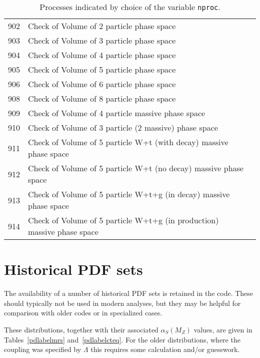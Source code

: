 \documentclass[12pt]{article}
\begin{document}
\begin{table}
\begin{center}
\begin{tabular}{|l|l|l|}
\hline
902 & Check of Volume of 2 particle phase space & \\  
903 & Check of Volume of 3 particle phase space & \\  
904 & Check of Volume of 4 particle phase space & \\  
905 & Check of Volume of 5 particle phase space & \\  
906 & Check of Volume of 6 particle phase space & \\  
908 & Check of Volume of 8 particle phase space & \\  
909 & Check of Volume of 4 particle massive phase space & \\  
910 & Check of Volume of 3 particle (2 massive) phase space & \\  
911 & Check of Volume of 5 particle W+t (with decay) massive phase space & \\  
912 & Check of Volume of 5 particle W+t (no decay) massive phase space & \\  
913 & Check of Volume of 5 particle W+t+g (in decay) massive phase space & \\  
914 & Check of Volume of 5 particle W+t+g (in production) massive phase space & \\  
\hline 
\hline
\end{tabular}
\caption{Processes indicated by choice of the variable {\tt nproc}.\label{nproctable}}
\end{center}
\end{table}
\clearpage


\section{Historical PDF sets}
\label{olderPDFs}
The availability of a number of historical PDF sets is retained in the code.  These should
typically not be used in modern analyses, but they may be helpful for comparison with
older codes or in specialized cases.

These distributions, together with their associated $\alpha_S(M_Z)$
values, are given in Tables~\ref{pdlabelmrs} and~\ref{pdlabelcteq}. 
For the older distributions, where the
coupling was specified by $\Lambda$ this requires 
some calculation and/or guesswork.
\end{document}

